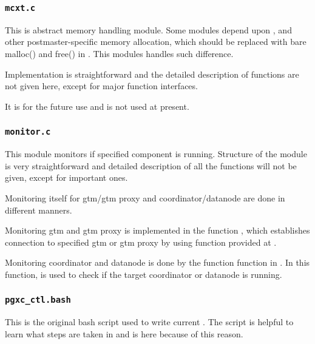 
\subsubsection{\texttt{mcxt.c}}

  This is abstract memory handling module.
  Some \XC{} modules depend upon ,  and other postmaster-specific
  memory allocation, which should be replaced with bare malloc() and free() in .
  This modules handles such difference.
  
  Implementation is straightforward and the detailed description of functions are not given
  here, except for major function interfaces.
  
  It is for the future use and is not used at present.



\subsubsection{\texttt{monitor.c}}

  This module monitors if specified component is running.
  Structure of the module is very straightforward and detailed description of all
  the functions will not be given, except for important ones.
  
  Monitoring itself for gtm/gtm proxy and coordinator/datanode are done in different manners.
  
  Monitoring gtm and gtm proxy is implemented in the function , which
  establishes connection to specified gtm or gtm proxy by using  function
  provided at .
  
  Monitoring coordinator and datanode is done by the function  function in .
  In this function,  is used to check if the target coordinator or datanode is running.



\subsubsection{\texttt{pgxc\_ctl.bash}}

  This is the original bash script used to write current .
  The script is helpful to learn what steps are taken in  and is here
  because of this reason.


